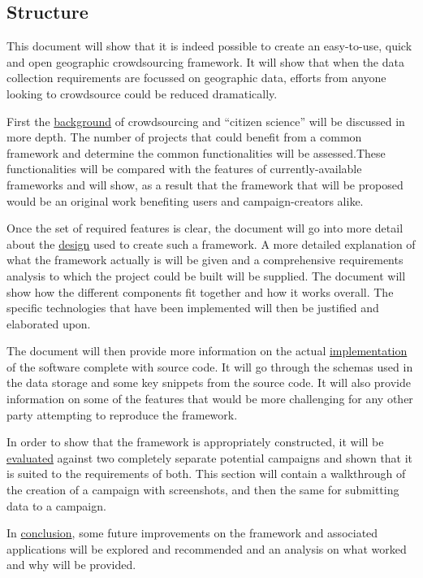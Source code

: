 \documentclass{article}
\begin{document}
		\subsection{Structure}
		This document will show that it is indeed possible to create an easy-to-use, quick and open geographic crowdsourcing framework. It will show that when the data collection requirements are focussed on geographic data, efforts from anyone looking to crowdsource could be reduced dramatically.

		First the \hyperref[sec:background]{background} of crowdsourcing and ``citizen science'' will be discussed in more depth. The number of projects that could benefit from a common framework and determine the common functionalities will be assessed.These functionalities will be compared with the features of currently-available frameworks and will show, as a result that the framework that will be proposed would be an original work benefiting users and campaign-creators alike.

		Once the set of required features is clear, the document will go into more detail about the \hyperref[sec:architecture]{design} used to create such a framework. A more detailed explanation of what the framework actually is will be given and a comprehensive requirements analysis to which the project could be built will be supplied. The document will show how the different components fit together and how it works overall. The specific technologies that have been implemented will then be justified and elaborated upon.

		The document will then provide more information on the actual \hyperref[sec:implementation]{implementation} of the software complete with source code. It will go through the schemas used in the data storage and some key snippets from the source code. It will also provide information on some of the features that would be more challenging for any other party attempting to reproduce the framework.

		In order to show that the framework is appropriately constructed, it will be \hyperref[sec:evaluation]{evaluated} against two completely separate potential campaigns and shown that it is suited to the requirements of both. This section will contain a walkthrough of the creation of a campaign with screenshots, and then the same for submitting data to a campaign.

		In \hyperref[sec:conclusion]{conclusion}, some future improvements on the framework and associated applications will be explored and recommended and an analysis on what worked and why will be provided.
\end{document}
